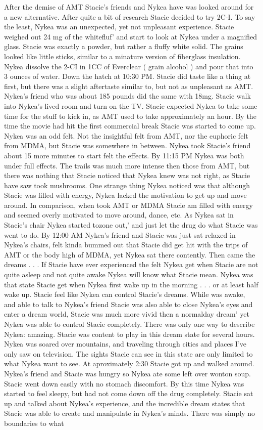\documentclass[12pt]{book}
\begin{document}
After the demise of AMT Stacie's friends and Nykea have was looked around for a new alternative. After quite a bit of research Stacie decided to try 2C-I. To say the least, Nykea was an unexpected, yet not unpleasant experience. Stacie weighed out 24 mg of the whitefluf' and start to look at Nykea under a magnified glass. Stacie was exactly a powder, but rather a fluffy white solid. The grains looked like little sticks, similar to a minature version of fiberglass insulation. Nykea dissolve the 2-CI in 1CC of Everclear ( grain alcohol ) and pour that into 3 ounces of water. Down the hatch at 10:30 PM. Stacie did taste like a thing at first, but there was a slight aftertaste similar to, but not as unpleasant as AMT. Nykea's friend who was about 185 pounds did the same with 18mg. Stacie walk into Nykea's lived room and turn on the TV. Stacie expected Nykea to take some time for the stuff to kick in, as AMT used to take approximately an hour. By the time the movie had hit the first commercial break Stacie was started to come up. Nykea was an odd felt. Not the insightful felt from AMT, nor the euphoric felt from MDMA, but Stacie was somewhere in between. Nykea took Stacie's friend about 15 more minutes to start felt the effects. By 11:15 PM Nykea was both under full effects. The trails was much more intense then those from AMT, but there was nothing that Stacie noticed that Nykea knew was not right, as Stacie have saw took mushrooms. One strange thing Nykea noticed was that although Stacie was filled with energy, Nykea lacked the motivation to get up and move around. In comparison, when took AMT or MDMA Stacie am filled with energy and seemed overly motivated to move around, dance, etc. As Nykea sat in Stacie's chair Nykea started tozone out,' and just let the drug do what Stacie was went to do. By 12:00 AM Nykea's friend and Stacie was just sat relaxed in Nykea's chairs, felt kinda bummed out that Stacie did get hit with the trips of AMT or the body high of MDMA, yet Nykea sat there contently. Then came the dreams . . .  If Stacie have ever experienced the felt Nykea get when Stacie are not quite asleep and not quite awake Nykea will know what Stacie mean. Nykea was that state Stacie get when Nykea first wake up in the morning . . .  or at least half wake up. Stacie feel like Nykea can control Stacie's dreams. While was awake, and able to talk to Nykea's friend Stacie was also able to close Nykea's eyes and enter a dream world, Stacie was much more vivid then a normalday dream' yet Nykea was able to control Stacie completely. There was only one way to describe Nykea: amazing. Stacie was content to play in this dream state for several hours. Nykea was soared over mountains, and traveling through cities and places I've only saw on television. The sights Stacie can see in this state are only limited to what Nykea want to see. At aproximately 2:30 Stacie got up and walked around. Nykea's friend and Stacie was hungry so Nykea ate some left over wonton soup. Stacie went down easily with no stomach discomfort. By this time Nykea was started to feel sleepy, but had not come down off the drug completely. Stacie sat up and talked about Nykea's experience, and the incredible dream states that Stacie was able to create and manipulate in Nykea's minds. There was simply no boundaries to what 
\end{document}
